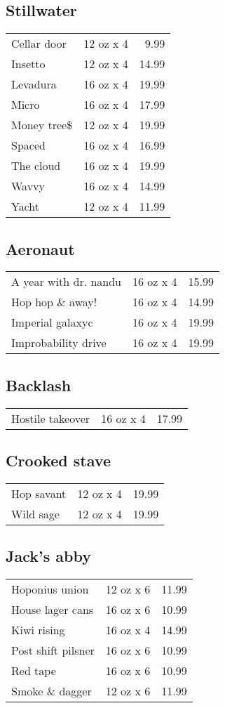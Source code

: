 \documentclass{article}%
\begin{document}
\begin{multicols}{3}
%
\subsection*{Stillwater}%
\begin{tabular}{l c r}%
Cellar door&12 oz x 4&9.99\\%
Insetto&12 oz x 4&14.99\\%
Levadura&16 oz x 4&19.99\\%
Micro&16 oz x 4&17.99\\%
Money tree\$&12 oz x 4&19.99\\%
Spaced&16 oz x 4&16.99\\%
The cloud&16 oz x 4&19.99\\%
Wavvy&16 oz x 4&14.99\\%
Yacht&12 oz x 4&11.99\\%
\end{tabular}

%
\subsection*{Aeronaut}%
\begin{tabular}{l c r}%
A year with dr. nandu&16 oz x 4&15.99\\%
Hop hop \& away!&16 oz x 4&14.99\\%
Imperial galaxyc&16 oz x 4&19.99\\%
Improbability drive&16 oz x 4&19.99\\%
\end{tabular}

%
\subsection*{Backlash}%
\begin{tabular}{l c r}%
Hostile takeover&16 oz x 4&17.99\\%
\end{tabular}

%
\subsection*{Crooked stave}%
\begin{tabular}{l c r}%
Hop savant&12 oz x 4&19.99\\%
Wild sage&12 oz x 4&19.99\\%
\end{tabular}

%
\subsection*{Jack's abby}%
\begin{tabular}{l c r}%
Hoponius union&12 oz x 6&11.99\\%
House lager cans&16 oz x 6&10.99\\%
Kiwi rising&16 oz x 4&14.99\\%
Post shift pilsner&16 oz x 6&10.99\\%
Red tape&16 oz x 6&10.99\\%
Smoke \& dagger&12 oz x 6&11.99\\%
\end{tabular}


\end{multicols}
\end{document}
